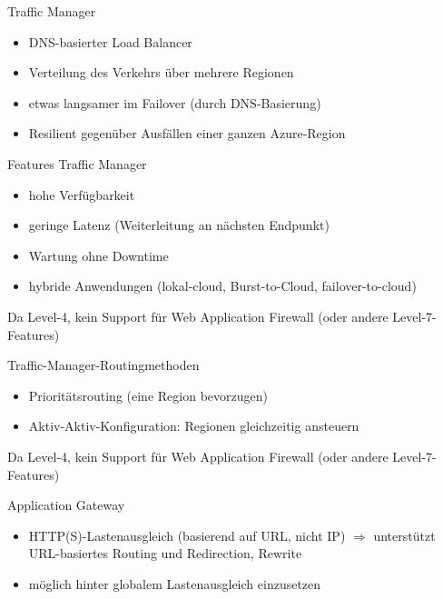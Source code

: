 \begin{flashcard}[]{Traffic Manager}
  \begin{itemize}
    \item DNS-basierter Load Balancer
    \item Verteilung des Verkehrs über mehrere Regionen
    \item etwas langsamer im Failover (durch DNS-Basierung)
    \item Resilient gegenüber Ausfällen einer ganzen Azure-Region
  \end{itemize}
\end{flashcard}

\begin{flashcard}[]{Features Traffic Manager}
  \begin{itemize}
    \item hohe Verfügbarkeit
    \item geringe Latenz (Weiterleitung an nächsten Endpunkt)
    \item Wartung ohne Downtime
    \item hybride Anwendungen (lokal-cloud, Burst-to-Cloud, failover-to-cloud)
  \end{itemize}
  Da Level-4, kein Support für Web Application Firewall (oder andere Level-7-Features)
\end{flashcard}

\begin{flashcard}[]{Traffic-Manager-Routingmethoden}
  \begin{itemize}
    \item Prioritätsrouting (eine Region bevorzugen)
    \item Aktiv-Aktiv-Konfiguration: Regionen gleichzeitig ansteuern
  \end{itemize}
  Da Level-4, kein Support für Web Application Firewall (oder andere Level-7-Features)
\end{flashcard}

\begin{flashcard}[]{Application Gateway}
  \begin{itemize}
    \item HTTP(S)-Lastenausgleich (basierend auf URL, nicht IP)\newline
      $\Rightarrow$ unterstützt URL-basiertes Routing und Redirection, Rewrite
    \item möglich hinter globalem Lastenausgleich einzusetzen
  \end{itemize}
\end{flashcard}

